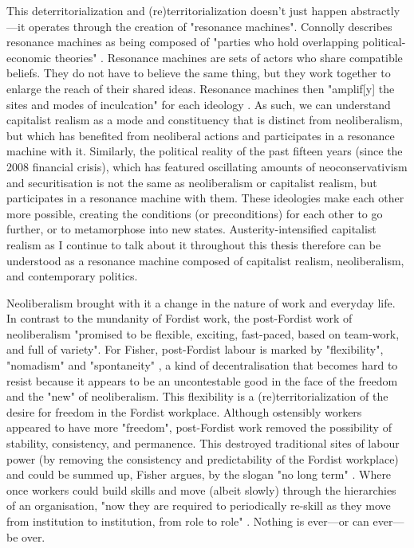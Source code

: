 This deterritorialization and (re)territorialization doesn't just happen abstractly—it operates through the creation of "resonance machines". Connolly describes resonance machines as being composed of "parties who hold overlapping political-economic theories" \citep[p. 68]{connolly_fragility_2013}. Resonance machines are sets of actors who share compatible beliefs. They do not have to believe the same thing, but they work together to enlarge the reach of their shared ideas. Resonance machines then "amplif[y] the sites and modes of inculcation" for each ideology \citeyearpar[p. 68]{connolly_fragility_2013}. As such, we can understand capitalist realism as a mode and constituency that is distinct from neoliberalism, but which has benefited from neoliberal actions and participates in a resonance machine with it. Similarly, the political reality of the past  fifteen years (since the 2008 financial crisis), which has featured oscillating amounts of neoconservativism and securitisation is not the same as neoliberalism or capitalist realism, but participates in a resonance machine with them. These ideologies make each other more possible, creating the conditions (or preconditions) for each other to go further, or to metamorphose into new states. Austerity-intensified capitalist realism as I continue to talk about it throughout this thesis therefore can be understood as a resonance machine composed of capitalist realism, neoliberalism, and contemporary politics. 

Neoliberalism brought with it a change in the nature of work and everyday life. In contrast to the mundanity of Fordist work, the post-Fordist work of neoliberalism "promised to be flexible, exciting, fast-paced, based on team-work, and full of variety". For Fisher, post-Fordist labour is marked by "flexibility", "nomadism" and "spontaneity" \citeyearpar[p. 28]{fisher_capitalist_2009}, a kind of decentralisation that becomes hard to resist because it appears to be an uncontestable good in the face of the freedom and the "new" of neoliberalism. This flexibility is a (re)territorialization of the desire for freedom in the Fordist workplace. Although ostensibly workers appeared to have more "freedom", post-Fordist work removed the possibility of stability, consistency, and permanence. This destroyed traditional sites of labour power (by removing the consistency and predictability of the Fordist workplace) and could be summed up, Fisher argues, by the slogan "no long term" \citep[p. 36]{fisher_capitalist_2009}. Where once workers could build skills and move (albeit slowly) through the hierarchies of an organisation, "now they are required to periodically re-skill as they move from institution to institution, from role to role" \citep[p. 36]{fisher_capitalist_2009}. Nothing is ever—or can ever—be over.

